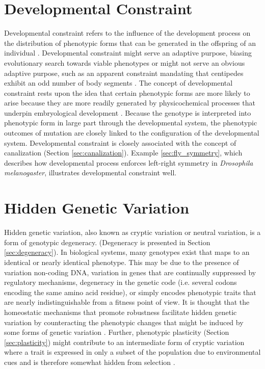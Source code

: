   
\section{Developmental Constraint} \label{sec:developmental_constraint}
Developmental constraint refers to the influence of the development process on the distribution of phenotypic forms that can be generated in the offspring of an individual \cite{Smith1985DevelopmentalBiology}. Developmental constraint might serve an adaptive purpose, biasing evolutionary search towards viable phenotypes \cite[pg 40]{Downing2015IntelligenceSystems} or might not serve an obvious adaptive purpose, such as an apparent constraint mandating that centipedes exhibit an odd number of body segments \cite{Arthur1999TheEvolution}. The concept of developmental constraint rests upon the idea that certain phenotypic forms are more likely to arise because they are more readily generated by physicochemical processes that underpin embryological development \cite{Smith1985DevelopmentalBiology}. Because the genotype is interpreted into phenotypic form in large part through the developmental system, the phenotypic outcomes of mutation are closely linked to the configuration of the developmental system. Developmental constraint is closely associated with the concept of canalization (Section \ref{sec:canalization}). Example \ref{sec:fly_symmetry}, which describes how developmental process enforces left-right symmetry in \textit{Drosophila melanogaster}, illustrates developmental constraint well.
 
        
\section{Hidden Genetic Variation} \label{sec:hidden_genetic_variation}
Hidden genetic variation, also known as cryptic variation or neutral variation, is a form of genotypic degeneracy. (Degeneracy is presented in Section \ref{sec:degeneracy}). In biological systems, many genotypes exist that maps to an identical or nearly identical phenotype. This may be due to the presence of variation non-coding DNA, variation in genes that are continually suppressed by regulatory mechanisms, degeneracy in the genetic code (i.e. several codons encoding the same amino acid residue), or simply encodes phenotypic traits that are nearly indistinguishable from a fitness point of view. It is thought that the homeostatic mechanisms that promote robustness facilitate hidden genetic variation by counteracting the phenotypic changes that might be induced by some forms of genetic variation \cite{Moczek2011TheInnovation}. Further, phenotypic plasticity (Section \ref{sec:plasticity}) might contribute to an intermediate form of cryptic variation where a trait is expressed in only a subset of the population due to environmental cues and is therefore somewhat hidden from selection \cite{Moczek2011TheInnovation}.
 
